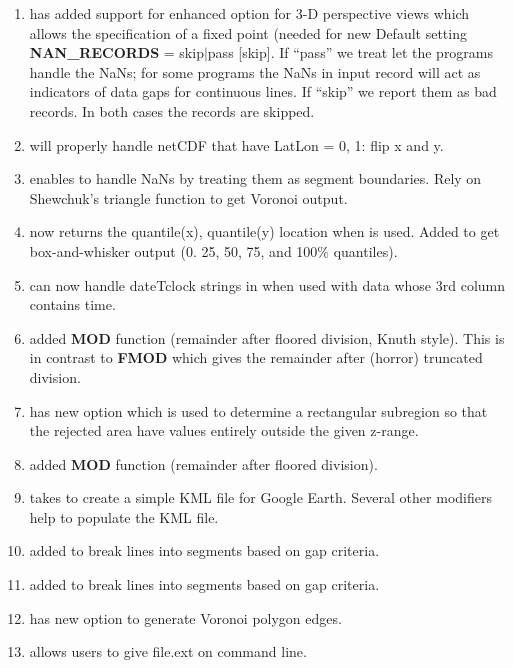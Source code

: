 \begin{enumerate}
	\item {} has added support for enhanced  option for 3-D perspective
		views which allows the specification of a fixed point (needed for
		new Default setting {\bf NAN\_RECORDS} = skip$|$pass [skip].
		If ``pass'' we treat let the programs handle the NaNs; for some
		programs the NaNs in input record will act as indicators of
		data gaps for continuous lines.  If ``skip'' we report them
		as bad records.  In both cases the records are skipped.
	\item {} will properly handle netCDF that have LatLon = 0, 1: flip x and y.
	\item {} enables  to handle NaNs by treating them as segment
		boundaries.  Rely on Shewchuk's triangle function to get Voronoi output.
	\item {} now returns the quantile(x), quantile(y) location when  is used.
		Added  to get box-and-whisker output (0. 25, 50, 75, and 100\% quantiles).
	\item {} can now handle dateTclock strings in  when used with
		data whose 3rd column contains time.
	\item {} added {\bf MOD} function (remainder after floored division,
		Knuth style). This is in contrast to {\bf FMOD} which gives the remainder after (horror) truncated division.
	\item {} has new option  which is used to determine a rectangular subregion
		so that the rejected area have values entirely outside the given z-range.
	\item {} added {\bf MOD} function (remainder after floored division).
	\item {} takes  to create a simple KML file for Google Earth.  Several
		other modifiers help to populate the KML file.
	\item {} added  to break lines into segments based on gap criteria.
	\item {} added  to break lines into segments based on gap criteria.
	\item {} has new option  to generate Voronoi polygon edges.
	\item {} allows users to give file.ext on command line.

\end{enumerate}
